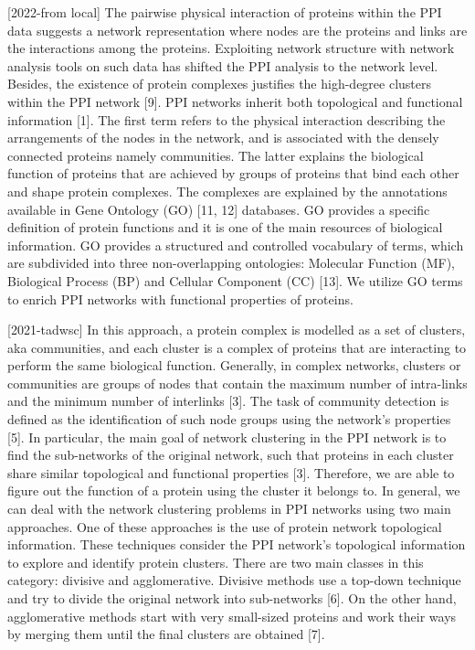 [2022-from local]
The pairwise physical interaction of proteins within the PPI data suggests a network representation where nodes are the proteins and links are the interactions among the proteins. Exploiting network structure with network analysis tools on such data has shifted the PPI analysis to the network level. Besides, the existence of protein complexes justifies the high-degree clusters within the PPI network [9]. PPI networks inherit both topological and functional information [1]. The first term refers to the physical interaction describing the arrangements of the nodes in the network, and is associated with the densely connected proteins namely communities. The latter explains the biological function of proteins that are achieved by groups of proteins that bind each other and shape protein complexes. The complexes are explained by the annotations available in Gene Ontology (GO) [11, 12] databases. GO provides a specific definition of protein functions and it is one of the main resources of biological information. GO provides a structured and controlled vocabulary of terms, which are subdivided into three non-overlapping ontologies: Molecular Function (MF), Biological Process (BP) and Cellular Component (CC) [13]. We utilize GO terms to enrich PPI networks with functional properties of proteins.


[2021-tadwsc]
In this approach, a protein complex is modelled as a set of clusters, aka communities, and each cluster is a complex of proteins that are interacting to perform the same biological function. Generally, in complex networks, clusters or communities are groups of nodes that contain the maximum number of intra-links and the minimum number of interlinks [3]. The task of community detection is defined as the identification of such node groups using the network’s properties [5]. In particular, the main goal of network clustering in the PPI network is to find the sub-networks of the original network, such that proteins in each cluster share similar topological and functional properties [3]. Therefore, we are able to figure out the function of a protein using the cluster it belongs to. In general, we can deal with the network clustering problems in PPI networks using two main approaches. One of these approaches is the use of protein network topological information. These techniques consider the PPI network’s topological information to explore and identify protein clusters. There are two main classes in this category: divisive and agglomerative. Divisive methods use a top-down technique and try to divide the original network into sub-networks [6]. On the other hand, agglomerative methods start with very small-sized proteins and work their ways by merging them until the final clusters are obtained [7].
\fi


